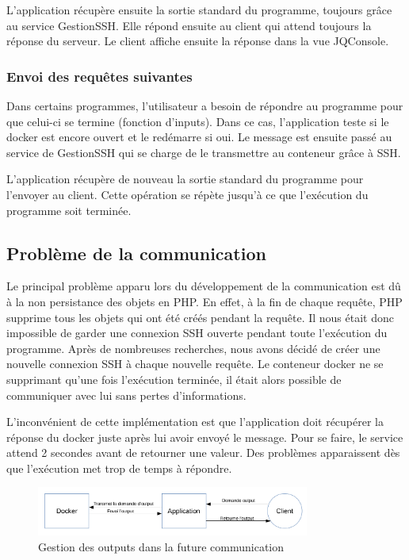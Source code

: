 \par L'application récupère ensuite la sortie standard du programme, toujours grâce au service GestionSSH. Elle répond ensuite au client qui attend toujours la réponse du serveur. Le client affiche ensuite la réponse dans la vue JQConsole.

\subsubsection{Envoi des requêtes suivantes}

\par Dans certains programmes, l'utilisateur a besoin de répondre au programme pour que celui-ci se termine (fonction d'inputs). Dans ce cas, l'application teste si le docker est encore ouvert et le redémarre si oui. Le message est ensuite passé au service de GestionSSH qui se charge de le transmettre au conteneur grâce à SSH.

\par L'application récupère de nouveau la sortie standard du programme pour l'envoyer au client. Cette opération se répète jusqu'à ce que l'exécution du programme soit terminée.

\subsection{Problème de la communication}

\par Le principal problème apparu lors du développement de la communication est dû à la non persistance des objets en PHP. En effet, à la fin de chaque requête, PHP supprime tous les objets qui ont été créés pendant la requête. Il nous était donc impossible de garder une connexion SSH ouverte pendant toute l'exécution du programme. Après de nombreuses recherches, nous avons décidé de créer une nouvelle connexion SSH à chaque nouvelle requête. Le conteneur docker ne se supprimant qu'une fois l'exécution terminée, il était alors possible de communiquer avec lui sans pertes d'informations.

\par L'inconvénient de cette implémentation est que l'application doit récupérer la réponse du docker juste après lui avoir envoyé le message. Pour se faire, le service attend 2 secondes avant de retourner une valeur. Des problèmes apparaissent dès que l'exécution met trop de temps à répondre.

\begin{figure}[H]
\centering
\includegraphics[width=0.8\textwidth]{./img/newcomoutput.png}
\caption{Gestion des outputs dans la future communication}
\end{figure}

